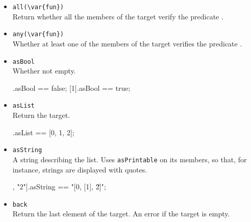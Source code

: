 \begin{itemize}
\item \lstinline|all(\var{fun})|\\
  Return whether all the members of the target verify the predicate
  .


\item \lstinline|any(\var{fun})|\\
  Whether at least one of the members of the target verifies the
  predicate .


\item \lstinline|asBool|\\
  Whether not empty.
\begin{urbiassert}[firstnumber=last]
[].asBool == false;
[1].asBool == true;
\end{urbiassert}

\item \lstinline|asList|\\
Return the target.

\begin{urbiassert}[firstnumber=last]
[0, 1, 2].asList == [0, 1, 2];
\end{urbiassert}

\item \lstinline|asString|\\
  A string describing the list.  Uses \lstinline|asPrintable| on its
  members, so that, for instance, strings are displayed with quotes.

\begin{urbiassert}[firstnumber=last]
[0, [1], "2"].asString == "[0, [1], \"2\"]";
\end{urbiassert}

\item \lstinline|back|\\
Return the last element of the target. An error if the target is empty.


\end{itemize}
